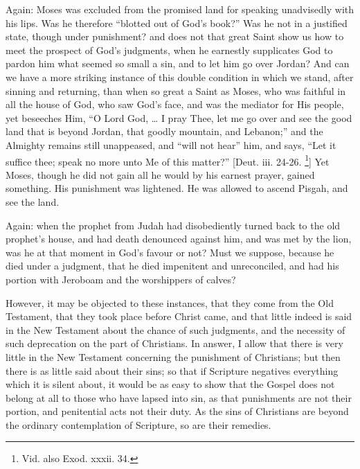 Again: Moses was excluded from the promised land for speaking
unadvisedly with his lips. Was he therefore ``blotted out of God's
book?'' Was he not in a justified state, though under punishment?
and does not that great Saint show us how to meet the prospect of
God's judgments, when he earnestly supplicates God to pardon him what
seemed so small a sin, and to let him go over Jordan? And can we have
a more striking instance of this double condition in which we stand,
after sinning and returning, than when so great a Saint as Moses, who
was faithful in all the house of God, who saw God's face, and was the
mediator for His people, yet beseeches Him, ``O Lord God, … I
pray Thee, let me go over and see the good land that is beyond Jordan,
that goodly mountain, and Lebanon;'' and the Almighty remains
still unappeased, and ``will not hear'' him, and says,
``Let it suffice thee; speak no more unto Me of this matter?''
[Deut. iii. 24-26. \footnote{Vid. also Exod. xxxii. 34.}] Yet
Moses, though he did not gain all he would by his earnest prayer,
gained something. His punishment was lightened. He was allowed to
ascend Pisgah, and see the land.

Again: when the prophet from Judah had disobediently turned back to
the old prophet's house, and had death denounced against him, and was
met by the lion, was he at that moment in God's favour or not? Must we
suppose, because he died under a judgment, that he died impenitent and
unreconciled, and had his portion with Jeroboam and the worshippers of
calves?

However, it may be objected to these instances, that they come from
the Old Testament, that they took place before Christ came, and that
little indeed is said in the New Testament about the chance of such
judgments, and the necessity of such deprecation on the part of
Christians. In answer, I allow that there is very little in the New
Testament concerning the punishment of Christians; but then there is
as little said about their sins; so that if Scripture negatives
everything which it is silent about, it would be as easy to show that
the Gospel does not belong at all to those who have lapsed into sin,
as that punishments are not their portion, and penitential acts not
their duty. As the sins of Christians are beyond the ordinary
contemplation of Scripture, so are their remedies.

